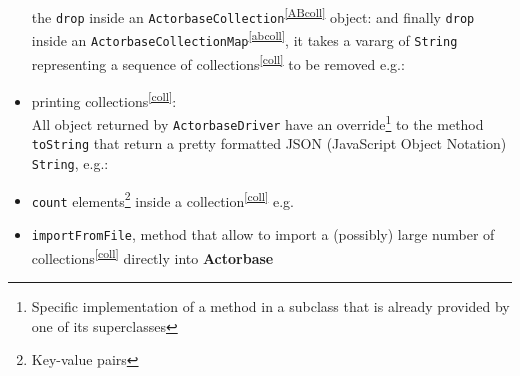 \documentclass{scalatekids-article}
\begin{document}
\begin{itemize}
  the \verb=drop= inside an \verb=ActorbaseCollection=\textsuperscript{\ref{ABcoll}} object:
  and finally \verb=drop= inside an \verb=ActorbaseCollectionMap=\textsuperscript{\ref{abcoll}}, it takes a
  vararg of \verb=String= representing a sequence of collections\textsuperscript{\ref{coll}} to be removed
  e.g.:
\item printing collections\textsuperscript{\ref{coll}}:\\All object returned by \verb=ActorbaseDriver=
  have an override\footnote{Specific implementation of a method in a subclass that
    is already provided by one of its superclasses} to the method \verb=toString=
  that return a pretty formatted JSON (JavaScript Object Notation) \verb=String=, e.g.:
\item \verb=count= elements\footnote{Key-value pairs} inside a collection\textsuperscript{\ref{coll}} e.g.

\item \verb=importFromFile=, method that allow to import a (possibly) large number of collections\textsuperscript{\ref{coll}}
  directly into \textbf{Actorbase}


\end{itemize}
\end{document}
